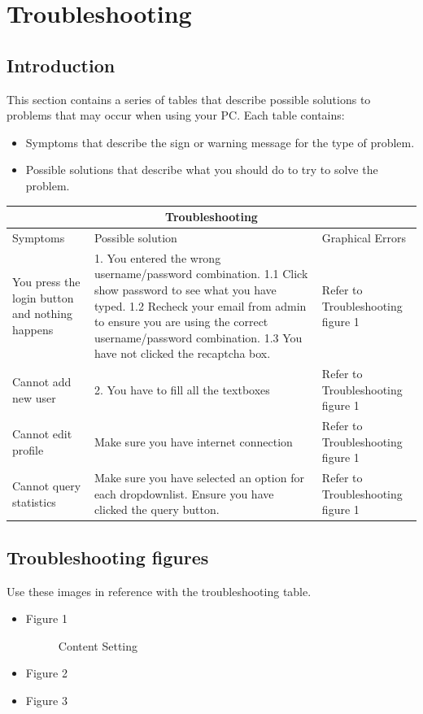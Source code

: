 \documentclass[14pt, a4paper]{article}
\begin{document}
\section{Troubleshooting}
\subsection{Introduction}
This section contains a series of tables that describe
possible solutions to problems that may occur when
using your PC. Each table contains: \\
\begin{itemize}
	\item Symptoms that describe the sign or warning message for the type of problem.
	\item Possible solutions that describe what you should
do to try to solve the problem. 
\end{itemize}

\setlength{\arrayrulewidth}{1mm}
\setlength{\tabcolsep}{18pt}
\renewcommand{\arraystretch}{1.5}
 

\begin{tabular}{ |p{3.5cm}|p{3.5cm} | p{3.5cm}|  }
\hline
\multicolumn{3}{|c|}{Troubleshooting} \\
\hline
Symptoms & Possible solution  & Graphical Errors\\
\hline
You press the login button and nothing happens & 1. You entered the wrong username/password combination. 1.1 Click show password to see what you have typed. 1.2 Recheck your email from admin to ensure you are using the correct username/password combination. 1.3 You have not clicked the recaptcha box.   & Refer to Troubleshooting figure 1\\ \hline
Cannot add new user & 2. You have to fill all the textboxes & Refer to Troubleshooting figure 1\\ \hline
Cannot edit profile    &Make sure you have internet connection & Refer to Troubleshooting figure 1 \\ \hline
Cannot query statistics & Make sure you have selected an option for each dropdownlist. Ensure you have clicked the query button.  & Refer to Troubleshooting figure 1\\
\hline
\end{tabular}

\subsection{Troubleshooting figures}
Use these images in reference with the troubleshooting table.

\begin{itemize}
	\item Figure 1
	\begin{figure}[H]
        \centerline{}
		\caption{Content Setting}
      \end{figure}
	\item Figure 2
	
	\item Figure 3
\end{itemize}
\end{document}
